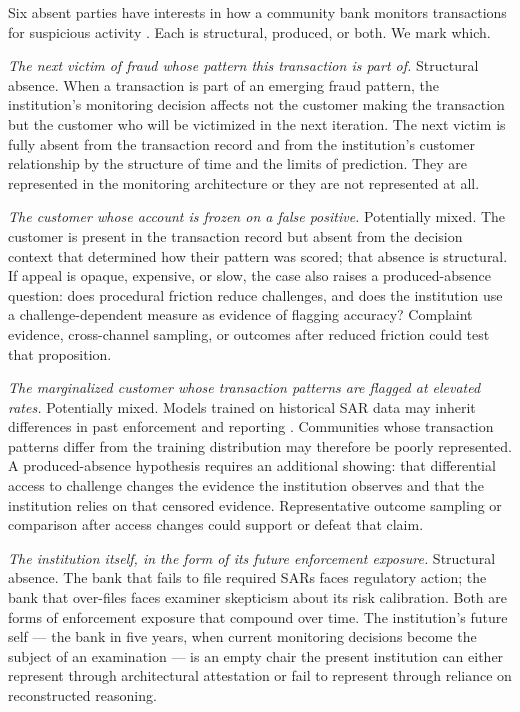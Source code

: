 Six absent parties have interests in how a community bank monitors transactions for suspicious activity \parencite{ffiecBSAAMLManual}. Each is structural, produced, or both. We mark which.

\emph{The next victim of fraud whose pattern this transaction is part of.} Structural absence. When a transaction is part of an emerging fraud pattern, the institution's monitoring decision affects not the customer making the transaction but the customer who will be victimized in the next iteration. The next victim is fully absent from the transaction record and from the institution's customer relationship by the structure of time and the limits of prediction. They are represented in the monitoring architecture or they are not represented at all.

\emph{The customer whose account is frozen on a false positive.} Potentially mixed. The customer is present in the transaction record but absent from the decision context that determined how their pattern was scored; that absence is structural. If appeal is opaque, expensive, or slow, the case also raises a produced-absence question: does procedural friction reduce challenges, and does the institution use a challenge-dependent measure as evidence of flagging accuracy? Complaint evidence, cross-channel sampling, or outcomes after reduced friction could test that proposition.

\emph{The marginalized customer whose transaction patterns are flagged at elevated rates.} Potentially mixed. Models trained on historical SAR data may inherit differences in past enforcement and reporting \parencite{treasuryDeRisking2023}. Communities whose transaction patterns differ from the training distribution may therefore be poorly represented. A produced-absence hypothesis requires an additional showing: that differential access to challenge changes the evidence the institution observes and that the institution relies on that censored evidence. Representative outcome sampling or comparison after access changes could support or defeat that claim.

\emph{The institution itself, in the form of its future enforcement exposure.} Structural absence. The bank that fails to file required SARs faces regulatory action; the bank that over-files faces examiner skepticism about its risk calibration. Both are forms of enforcement exposure that compound over time. The institution's future self --- the bank in five years, when current monitoring decisions become the subject of an examination --- is an empty chair the present institution can either represent through architectural attestation or fail to represent through reliance on reconstructed reasoning.

